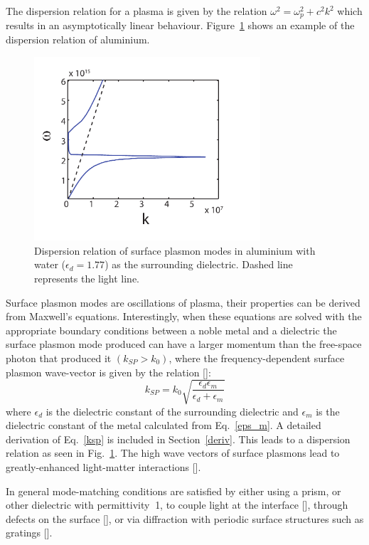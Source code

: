 The dispersion relation for a plasma is given by the relation $\omega^2 = \omega_p^2+c^2k^2$ which results in an asymptotically linear behaviour. Figure~\ref{dispRelation} shows an example of the dispersion relation of aluminium.
\begin{figure}[b!]
\centering
\includegraphics[width=0.75\textwidth]{dispRelation.pdf}
\caption{Dispersion relation of surface plasmon modes in aluminium with water ($\epsilon_d=1.77$) as the surrounding dielectric. Dashed line represents the light line.}
\label{dispRelation}
\end{figure}

Surface plasmon modes are oscillations of plasma, their properties can be derived from Maxwell's equations. Interestingly, when these equations are solved with the appropriate boundary conditions between a noble metal and a dielectric the surface plasmon mode produced can have a larger momentum than the free-space photon that produced it $(k_{SP}>k_0)$, where the frequency-dependent surface plasmon wave-vector is given by the relation [\cite{Sambles}]:
\begin{equation}
k_{SP} = k_0\sqrt{\frac{\epsilon_d\epsilon_m}{\epsilon_d+\epsilon_m}}
\label{ksp}
\end{equation}
where $\epsilon_d$ is the dielectric constant of the surrounding dielectric and $\epsilon_m$ is the dielectric constant of the metal calculated from Eq.~\ref{eps_m}. A detailed derivation of Eq.~\ref{ksp} is included in Section~\ref{deriv}. This leads to a dispersion relation as seen in Fig.~\ref{dispRelation}. The high wave vectors of surface plasmons lead to greatly-enhanced light-matter interactions [\cite{Todorov}].

In general mode-matching conditions are satisfied by either using a prism, or other dielectric with permittivity $\>$1, to couple light at the interface [\cite{Kretschmann}], through defects on the surface [\cite{Hecht}], or via diffraction with periodic surface structures such as gratings [\cite{Ritchie}].

